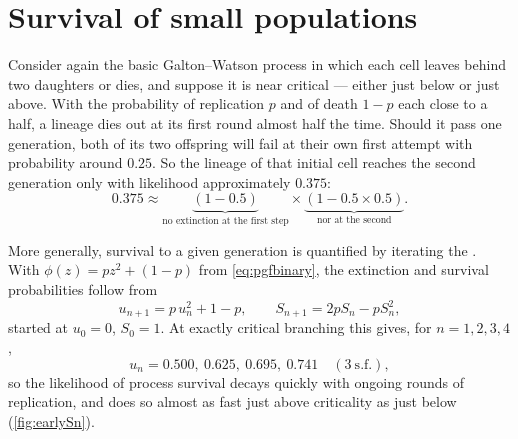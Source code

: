 \section{Survival of small populations}
\label{sec:small}

Consider again the basic Galton--Watson process in which each cell leaves behind two
daughters or dies, and suppose it is near critical --- either just below or just above.
With the probability of replication $p$ and of death $1-p$ each close to a half, a
lineage dies out at its first round almost half the time. Should it pass one generation,
both of its two offspring will fail at their own first attempt with probability around
$0.25$. So the lineage of that initial cell reaches the second generation only with
likelihood approximately $0.375$:
\begin{equation*}
0.375 \approx \underbrace{(1-0.5)}_{\text{no extinction at the first step}}\times\underbrace{(1-0.5\times0.5)}_{\text{nor at the second}} .
\end{equation*}

More generally, survival to a given generation is quantified by iterating the \pgf{}.
With $\phi(z) = pz^2 + (1-p)$ from \cref{eq:pgfbinary}, the extinction and survival
probabilities follow from
\begin{equation}
\label{ext}
u_{n+1} = p\,u_n^2 + 1-p ,
\qquad
S_{n+1} = 2pS_n - pS_n^2 ,
\end{equation}
started at $u_0 = 0$, $S_0 = 1$. At exactly critical branching this gives, for
$n = 1,2,3,4$,
\begin{equation*}
u_n = 0.500,\ 0.625,\ 0.695,\ 0.741\quad(3\ \text{s.f.}),
\end{equation*}
so the likelihood of process survival decays quickly with ongoing rounds of
replication, and does so almost as fast just above criticality as just below
(\cref{fig:earlySn}).


